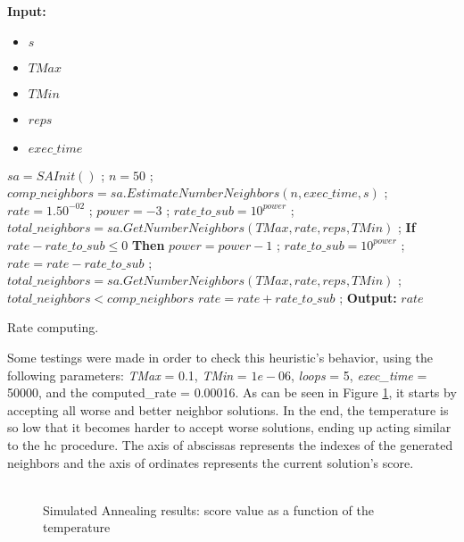 \begin{algorithm}[t!]
\textbf{Input:} 
\begin{itemize}
	\setlength{\itemsep}{1pt}
	\item $s$ 
	\item $TMax$ 
	\item $TMin$ 
	\item $reps$ 
	\item $exec\_time$ 
\end{itemize}
\begin{algorithmic}
\State $sa = SAInit()$ ;
\State $n = 50$ ; 
\State $comp\_neighbors = sa.EstimateNumberNeighbors(n, exec\_time, s)$ ;
\State $rate = 1.50^{-02}$ ;
\State $power = -3$ ;
\State $rate\_to\_sub = 10^{power}$ ;
\State $total\_neighbors = sa.GetNumberNeighbors(TMax, rate, reps, TMin)$ ;
\Repeat	
	\State \textbf{If} $rate - rate\_to\_sub \leq 0$ \textbf{Then} $power = power - 1$ ; $rate\_to\_sub = 10^{power}$ ;
	\State $rate = rate - rate\_to\_sub$ ;
	\State $total\_neighbors = sa.GetNumberNeighbors(TMax, rate, reps, TMin)$ ;
\Until $total\_neighbors < comp\_neighbors$
\State $rate = rate + rate\_to\_sub$ ; 
\State \textbf{Output:} $rate$ 
\end{algorithmic}
\caption{Rate computing.}
\label{alg:RateComputing}
\end{algorithm}Some testings were made in order to check this heuristic's behavior, using the following parameters: \textit{TMax} = 0.1, \textit{TMin} = $1e-06$, \textit{loops} = 5, \textit{exec\_time} = 50000, and the computed\_rate = 0.00016. As can be seen in Figure \ref{fig:SimulatedAnnealingPlot}, it starts by accepting all worse and better neighbor solutions. In the end, the temperature is so low that it becomes harder to accept worse solutions, ending up acting similar to the \gls{hc} procedure. The axis of abscissas represents the indexes of the generated neighbors and the axis of ordinates represents the current solution's score.\\
\\
\begin{figure}[!t]
\centering


\caption{Simulated Annealing results: score value as a function of the temperature} 
\label{fig:SimulatedAnnealingPlot}
\end{figure}

